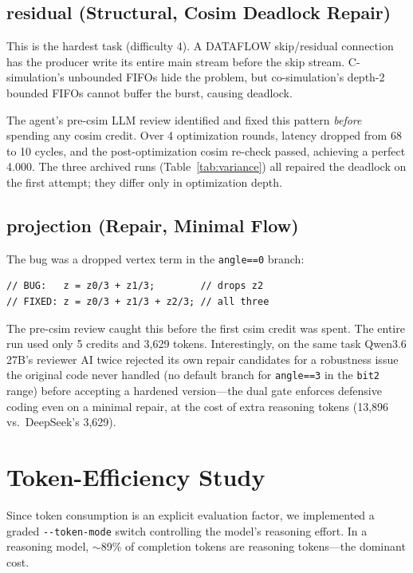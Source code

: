 \documentclass[10pt,conference,letterpaper]{IEEEtran}
\begin{document}
\subsection{residual (Structural, Cosim Deadlock Repair)}

This is the hardest task (difficulty 4). A DATAFLOW skip/residual connection has the producer write its entire main stream before the skip stream. C-simulation's unbounded FIFOs hide the problem, but co-simulation's depth-2 bounded FIFOs cannot buffer the burst, causing deadlock.

The agent's pre-csim LLM review identified and fixed this pattern \emph{before} spending any cosim credit. Over 4 optimization rounds, latency dropped from 68 to 10 cycles, and the post-optimization cosim re-check passed, achieving a perfect 4.000. The three archived runs (Table~\ref{tab:variance}) all repaired the deadlock on the first attempt; they differ only in optimization depth.

\subsection{projection (Repair, Minimal Flow)}

The bug was a dropped vertex term in the \texttt{angle==0} branch:
\begin{footnotesize}
\begin{verbatim}
// BUG:   z = z0/3 + z1/3;        // drops z2
// FIXED: z = z0/3 + z1/3 + z2/3; // all three
\end{verbatim}
\end{footnotesize}
The pre-csim review caught this before the first csim credit was spent. The entire run used only 5 credits and 3,629 tokens. Interestingly, on the same task Qwen3.6 27B's reviewer AI twice rejected its own repair candidates for a robustness issue the original code never handled (no default branch for \texttt{angle==3} in the \texttt{bit2} range) before accepting a hardened version---the dual gate enforces defensive coding even on a minimal repair, at the cost of extra reasoning tokens (13,896 vs.\ DeepSeek's 3,629).

\section{Token-Efficiency Study}
\label{sec:tokens}

Since token consumption is an explicit evaluation factor, we implemented a graded \texttt{-{}-token-mode} switch controlling the model's reasoning effort. In a reasoning model, $\sim$89\% of completion tokens are reasoning tokens---the dominant cost.
\end{document}
